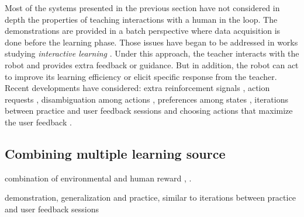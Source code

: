 Most of the systems presented in the previous section have not considered in depth the properties of teaching interactions with a human in the loop. The demonstrations are provided in a batch perspective where data acquisition is done before the learning phase. Those issues have began to be addressed in works studying \textit{interactive learning} \cite{kaplan2002robotic,nicolescu2003natural,Breazeal2004,thomaz2008teachable}. Under this approach, the teacher interacts with the robot and provides extra feedback or guidance. But in addition, the robot can act to improve its learning efficiency or elicit specific response from the teacher. Recent developments have considered: extra reinforcement signals \cite{thomaz2008teachable}, action requests \cite{macl09airl}, disambiguation among actions \cite{chernova09jair}, preferences among states \cite{Mason2011}, iterations between practice and user feedback sessions \cite{judah2010reinforcement} and choosing actions that maximize the user feedback \cite{knox2009interactively}.


\subsection{Combining multiple learning source}


combination of environmental and human reward \cite{knox2010combining}, \cite{griffith2013policy}. 

\cite{nicolescu2003natural} demonstration, generalization and practice, similar to iterations between practice and user feedback sessions \cite{judah2010reinforcement}


